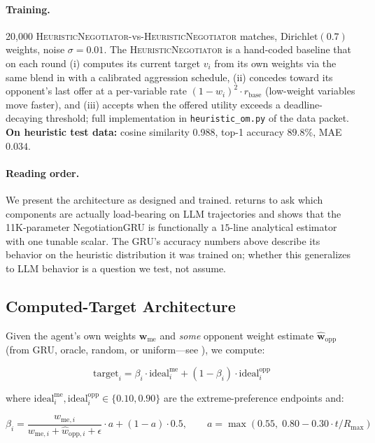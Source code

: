 \documentclass[11pt,a4paper]{article}
\begin{document}
\paragraph{Training.}
20{,}000 \textsc{HeuristicNegotiator}-vs-\textsc{HeuristicNegotiator} matches, $\text{Dirichlet}(0.7)$ weights, noise $\sigma = 0.01$. The \textsc{HeuristicNegotiator} is a hand-coded baseline that on each round (i) computes its current target $v_i$ from its own weights via the same blend in  with a calibrated aggression schedule, (ii) concedes toward its opponent's last offer at a per-variable rate $(1 - w_i)^2 \cdot r_\text{base}$ (low-weight variables move faster), and (iii) accepts when the offered utility exceeds a deadline-decaying threshold; full implementation in \texttt{heuristic\_om.py} of the data packet. \textbf{On heuristic test data:} cosine similarity 0.988, top-1 accuracy $89.8\%$, MAE $0.034$.

\paragraph{Reading order.} We present the architecture as designed and trained.  returns to ask which components are actually load-bearing on LLM trajectories and shows that the 11K-parameter NegotiationGRU is functionally a $15$-line analytical estimator with one tunable scalar. The GRU's accuracy numbers above describe its behavior on the heuristic distribution it was trained on; whether this generalizes to LLM behavior is a question we test, not assume.

\subsection{Computed-Target Architecture}
\label{sec:computed}

Given the agent's own weights $\mathbf{w}_{\text{me}}$ and \emph{some} opponent weight estimate $\hat{\mathbf{w}}_{\text{opp}}$ (from GRU, oracle, random, or uniform---see ), we compute:

\begin{equation}
\text{target}_i = \beta_i \cdot \text{ideal}_i^{\text{me}} + (1 - \beta_i) \cdot \text{ideal}_i^{\text{opp}}
\label{eq:target}
\end{equation}

where $\text{ideal}_i^{\text{me}}, \text{ideal}_i^{\text{opp}} \in \{0.10, 0.90\}$ are the extreme-preference endpoints and:

\begin{equation}
\beta_i = \frac{w_{\text{me},i}}{w_{\text{me},i} + \hat{w}_{\text{opp},i} + \epsilon} \cdot a + (1 - a) \cdot 0.5, \qquad a = \max(0.55,\; 0.80 - 0.30 \cdot t/R_{\max})
\label{eq:blend}
\end{equation}
\end{document}
